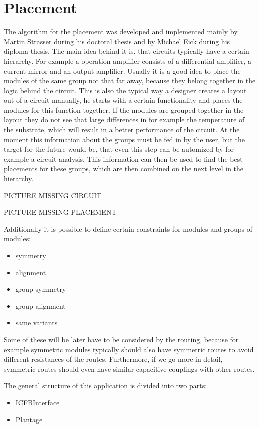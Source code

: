 \chapter{Placement}
The algorithm for the placement was developed and implemented mainly by Martin Strasser during his doctoral thesis and by Michael Eick during his diploma thesis. The main idea behind it is, that circuits typically have a certain hierarchy. For example a operation amplifier consists of a differential amplifier, a current mirror and an output amplifier. Usually it is a good idea to place the modules of the same group not that far away, because they belong together in the logic behind the circuit. This is also the typical way a designer creates a layout out of a circuit manually, he starts with a certain functionality and places the modules for this function together. If the modules are grouped together in the layout they do not see that large differences in for example the temperature of the substrate, which will result in a better performance of the circuit.
At the moment this information about the groups must be fed in by the user, but the target for the future would be, that even this step can be automized by for example a circuit analysis. This information can then be used to find the best placements for these groups, which are then combined on the next level in the hierarchy.

PICTURE MISSING CIRCUIT

PICTURE MISSING PLACEMENT

Additionally it is possible to define certain constraints for modules and groups of modules:
\begin{itemize}
\item symmetry
\item alignment
\item group symmetry
\item group alignment
\item same variants
\end{itemize}

Some of these will be later have to be considered by the routing, because for example symmetric modules typically should also have symmetric routes to avoid different resistances of the routes. Furthermore, if we go more in detail, symmetric routes should even have similar capacitive couplings with other routes.

The general structure of this application is divided into two parts:
\begin{itemize}
\item ICFBInterface
\item Plantage
\end{itemize}

